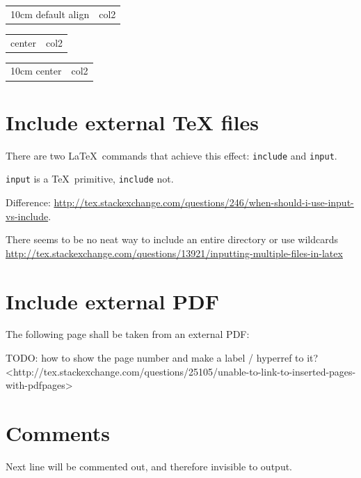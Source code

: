 \documentclass[12pt]{article}
\begin{document}
    \begin{tabular}{>{}m{10cm} | l}
      10cm default align & col2
    \end{tabular}

    \begin{tabular}{>{\centering}m{10cm} | l}
      10cm center & col2
    \end{tabular}

    \begin{tabular}{>{}m{10cm} | l}
      10cm center & col2
    \end{tabular}

\section{Include external TeX files}\label{include}

  There are two \LaTeX\ commands that achieve this effect: \lstinline|include| and \lstinline|input|.

  \lstinline|input| is a \TeX\ primitive, \lstinline|include| not.

  Difference: \url{http://tex.stackexchange.com/questions/246/when-should-i-use-input-vs-include}.

  There seems to be no neat way to include an entire directory or use wildcards \url{http://tex.stackexchange.com/questions/13921/inputting-multiple-files-in-latex}

\section{Include external PDF}\label{include-external-pdf}

  The following page shall be taken from an external PDF:

  

  TODO: how to show the page number and make a label / hyperref to it? <http://tex.stackexchange.com/questions/25105/unable-to-link-to-inserted-pages-with-pdfpages>

\section{Comments}\label{comments}

    Next line will be commented out, and therefore invisible to output.

\end{document}

